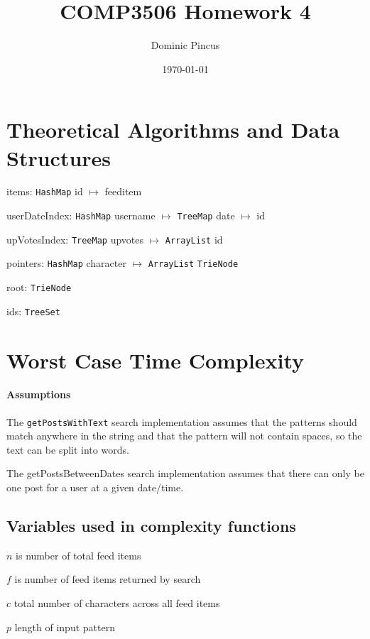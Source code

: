 \documentclass[11pt, oneside]{article}   	%
\title{COMP3506 Homework 4}
\author{Dominic Pincus}
\date{\today}
\begin{document}
\maketitle

\section{Theoretical Algorithms and Data Structures}

\begin{description}

\item items: \texttt{HashMap} id $\mapsto$ feeditem 
\item userDateIndex: \texttt{HashMap} username $\mapsto$ \texttt{TreeMap} date $\mapsto$ id 
\item upVotesIndex: \texttt{TreeMap} upvotes $\mapsto$ \texttt{ArrayList} id 
\item pointers: \texttt{HashMap} character $\mapsto$ \texttt{ArrayList} \texttt{TrieNode} 
\item root: \texttt{TrieNode} 
\item ids: \texttt{TreeSet} 

\end{description}

\section{Worst Case Time Complexity}

\paragraph{Assumptions}

The \texttt{getPostsWithText} search implementation assumes that the patterns should match anywhere in the string and that the pattern will not contain spaces, so the text can be split into words.

The getPostsBetweenDates search implementation assumes that there can only be one post for a user at a given date/time.

\subsection{Variables used in complexity functions}

\begin{description}

\item $n$ is number of total feed items
\item $f$ is number of feed items returned by search
\item $c$ total number of characters across all feed items
\item $p$ length of input pattern

\end{description}
\end{document}

